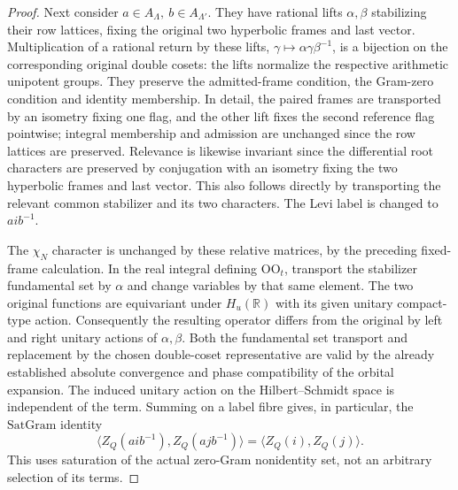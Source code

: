 \begin{proof}
Next consider \(a\in A_\Lambda,\ b\in A_{\Lambda'}\).
They have rational lifts \(\alpha,\beta\) stabilizing their
row lattices, fixing the original two hyperbolic frames and
last vector. Multiplication of a rational return by these
lifts, \(\gamma\mapsto\alpha\gamma\beta^{-1}\), is a
bijection on the corresponding original double cosets:
the lifts normalize the respective arithmetic unipotent
groups. They preserve the admitted-frame condition, the
Gram-zero condition and identity membership. In detail,
the paired frames are transported by an isometry fixing
one flag, and the other lift fixes the second reference
flag pointwise; integral membership and admission are
unchanged since the row lattices are preserved. Relevance
is likewise invariant since the differential root characters
are preserved by conjugation with an isometry fixing the
two hyperbolic frames and last vector. This also follows
directly by transporting the relevant common stabilizer
and its two characters. The Levi label is changed to
\(aib^{-1}\).

The \(\chi_N\) character is unchanged by these relative
matrices, by the preceding fixed-frame calculation.
In the real integral defining \(\mathrm{OO}_t\), transport
the stabilizer fundamental set by \(\alpha\) and change
variables by that same element. The two original functions
are equivariant under \(H_u(\mathbb R)\) with its given
unitary compact-type action. Consequently the resulting
operator differs from the original by left and right
unitary actions of \(\alpha,\beta\). Both the fundamental
set transport and replacement by the chosen double-coset
representative are valid by the already established
absolute convergence and phase compatibility of the
orbital expansion. The induced unitary action on the
Hilbert--Schmidt space is independent of the term.
Summing on a label fibre gives, in particular, the
\(\mathrm{SatGram}\) identity
\[
 \langle Z_Q(aib^{-1}),Z_Q(ajb^{-1})\rangle
       =\langle Z_Q(i),Z_Q(j)\rangle.
 \tag{FL7}
\]
This uses saturation of the actual zero-Gram nonidentity
set, not an arbitrary selection of its terms.


\end{proof}
